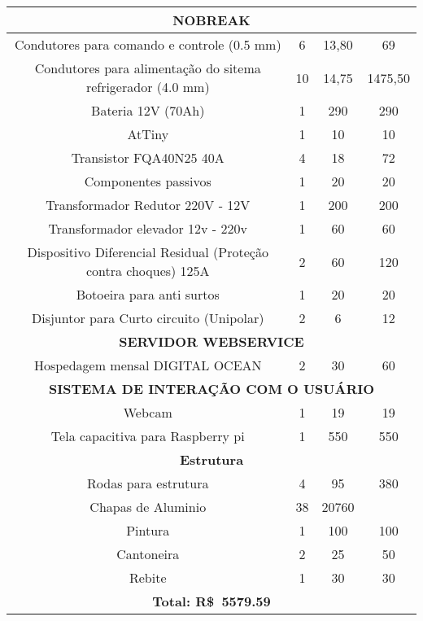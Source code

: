 \begin{table}[H]
{\begin{tabular}{|c|c|c|c|}
		\multicolumn{4}{|c|}{\textbf{NOBREAK}} \\ \hline
		Condutores para comando e controle (0.5 mm) & 6 & 13,80 & 69 \\ \hline
		Condutores para alimentação do sitema refrigerador (4.0 mm) & 10 & 14,75 & 1475,50 \\ \hline
		Bateria 12V (70Ah) & 1 & 290 & 290 \\ \hline
		AtTiny & 1 & 10 & 10 \\ \hline
		Transistor FQA40N25 40A & 4 & 18 & 72 \\ \hline
		Componentes passivos & 1 & 20 & 20 \\ \hline
		Transformador Redutor 220V - 12V & 1 & 200 & 200 \\ \hline
		Transformador elevador 12v - 220v & 1 & 60 & 60 \\ \hline
		Dispositivo Diferencial Residual (Proteção contra choques) 125A & 2 & 60 & 120 \\ \hline
		Botoeira para anti surtos & 1 & 20 & 20 \\ \hline
		Disjuntor para Curto circuito (Unipolar) & 2 & 6 & 12 \\ \hline
		\multicolumn{4}{|c|}{\textbf{SERVIDOR WEBSERVICE}} \\ \hline
		Hospedagem mensal DIGITAL OCEAN & 2 & 30 & 60 \\ \hline
		\multicolumn{4}{|c|}{\textbf{SISTEMA DE INTERAÇÃO COM O USUÁRIO}} \\ \hline
		Webcam & 1 & 19 & 19 \\ \hline
		Tela capacitiva para Raspberry pi & 1 & 550 & 550 \\ \hline
		\multicolumn{4}{|c|}{\textbf{Estrutura}} \\ \hline
		Rodas para estrutura & 4 & 95 & 380 \\ \hline
		Chapas de Aluminio & 38 & 20760 &  \\ \hline
		Pintura & 1 & 100 & 100 \\ \hline
		Cantoneira & 2 & 25 & 50 \\ \hline
		Rebite & 1 & 30 & 30 \\ \hline
		\multicolumn{4}{|c|}{\textbf{Total: R\$\ 5579.59}} \\ \hline
	\end{tabular}%
	}
\end{table}